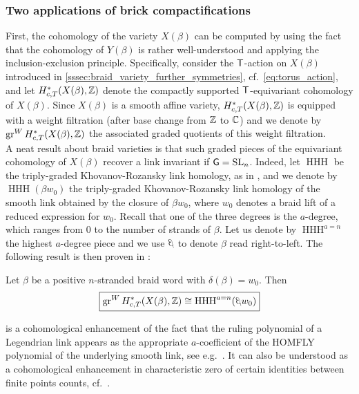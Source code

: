 \subsubsection{Two applications of brick compactifications}\label{sssec:applications_compactifications}

First, the cohomology of the variety $X(\beta)$ can be computed by using the fact that the cohomology of $Y(\beta)$ is rather well-understood and applying the inclusion-exclusion principle. Specifically, consider the $\mathsf{T}$-action on $X(\beta)$ introduced in \cref{sssec:braid_variety_further_symmetries}, cf.~\eqref{eq:torus_action}, and let $H_{c,T}^*(X(\beta),\mathbb{Z})$ denote the compactly supported $\mathsf{T}$-equivariant cohomology of $X(\beta)$. Since $X(\beta)$ is a smooth affine variety, $H_{c,T}^*(X(\beta),\mathbb{Z})$ is equipped with a weight filtration (after base change from $\mathbb{Z}$ to $\mathbb{C}$) and we denote by $\operatorname{gr}^W H_{c,T}^*(X(\beta),\mathbb{Z})$ the associated graded quotients of this weight filtration.\\

A neat result about braid varieties is that such graded pieces of the equivariant cohomology of $X(\beta)$ recover a link invariant if $\mathsf{G}=\operatorname{SL}_n$. Indeed, let $\operatorname{HHH}$ be the triply-graded Khovanov-Rozansky link homology, as in \cite{KhS,KR}, and we denote by $\operatorname{HHH}(\beta w_0)$ the triply-graded Khovanov-Rozansky link homology of the smooth link obtained by the closure of $\beta w_0$, where $w_0$ denotes a braid lift of a reduced expression for $w_0$. Recall that one of the three degrees is the $a$-degree, which ranges from $0$ to the number of strands of $\beta$. Let us denote by $\operatorname{HHH}^{a=n}$ the highest $a$-degree piece and we use $\ateb$ to denote $\beta$ read right-to-left. The following result is then proven in \cite[Theorem 4.22]{CGGS2}:

\begin{theorem}\label{thm:cohomology_and_HHH}
Let $\beta$ be a positive $n$-stranded braid word with $\delta(\beta)=w_0$. Then
\begin{equation}\label{eq:cohomology_and_HHH}
\boxed{\operatorname{gr}^W H_{c,T}^*(X(\beta),\Z)\cong \operatorname{HHH}^{a=n}(\ateb w_0)}
\end{equation}
\sbs
\end{theorem}

\noindent {} is a cohomological enhancement of the fact that the ruling polynomial of a Legendrian link appears as the appropriate $a$-coefficient  of the HOMFLY polynomial of the underlying smooth link, see e.g.~\cite{Rutherford06_HOMFLY,Rutherford11_HOMFLY}. It can also be understood as a cohomological enhancement in characteristic zero of certain identities between finite points counts, cf.~\cite{trinh2021heckecategoryunipotentlocus,trinh2022unipotentelementstwistinglink}.\\

